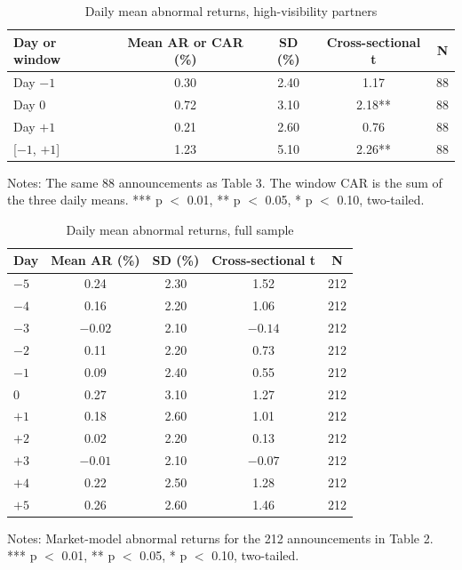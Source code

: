 \documentclass[11pt]{article}
\begin{document}
\begin{table}[h!]
\centering
\begin{threeparttable}
\caption{Daily mean abnormal returns, high-visibility partners}
\small
\begin{tabular}{lcccc}
\toprule
Day or window & Mean AR or CAR (\%) & SD (\%) & Cross-sectional t & N \\
\midrule
Day $-1$ & 0.30 & 2.40 & 1.17 & 88 \\
Day 0 & 0.72 & 3.10 & 2.18** & 88 \\
Day $+1$ & 0.21 & 2.60 & 0.76 & 88 \\
\midrule
{[}$-1$, $+1${]} & 1.23 & 5.10 & 2.26** & 88 \\
\bottomrule
\end{tabular}
\begin{tablenotes}\footnotesize
\item Notes: The same 88 announcements as Table 3. The window CAR is the sum of the three daily means. *** p $<$ 0.01, ** p $<$ 0.05, * p $<$ 0.10, two-tailed.
\end{tablenotes}
\end{threeparttable}
\end{table}

\begin{table}[h!]
\centering
\begin{threeparttable}
\caption{Daily mean abnormal returns, full sample}
\small
\begin{tabular}{lcccc}
\toprule
Day & Mean AR (\%) & SD (\%) & Cross-sectional t & N \\
\midrule
$-5$ & 0.24 & 2.30 & 1.52 & 212 \\
$-4$ & 0.16 & 2.20 & 1.06 & 212 \\
$-3$ & $-0.02$ & 2.10 & $-0.14$ & 212 \\
$-2$ & 0.11 & 2.20 & 0.73 & 212 \\
$-1$ & 0.09 & 2.40 & 0.55 & 212 \\
0 & 0.27 & 3.10 & 1.27 & 212 \\
$+1$ & 0.18 & 2.60 & 1.01 & 212 \\
$+2$ & 0.02 & 2.20 & 0.13 & 212 \\
$+3$ & $-0.01$ & 2.10 & $-0.07$ & 212 \\
$+4$ & 0.22 & 2.50 & 1.28 & 212 \\
$+5$ & 0.26 & 2.60 & 1.46 & 212 \\
\bottomrule
\end{tabular}
\begin{tablenotes}\footnotesize
\item Notes: Market-model abnormal returns for the 212 announcements in Table 2. *** p $<$ 0.01, ** p $<$ 0.05, * p $<$ 0.10, two-tailed.
\end{tablenotes}
\end{threeparttable}
\end{table}
\end{document}
